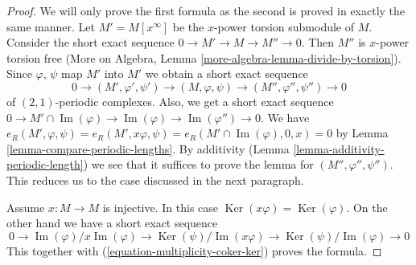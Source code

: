 \documentclass[10pt,a4paper]{amsart}
\theoremstyle{plain}
\theoremstyle{definition}
\theoremstyle{remark}
\numberwithin{equation}{subsection}
\def\Ker{\mathop{\mathrm{Ker}}}
\def\Im{\mathop{\mathrm{Im}}}
\begin{document}
\begin{proof}
We will only prove the first formula as the second is proved
in exactly the same manner.
Let $M' = M[x^\infty]$ be the $x$-power torsion submodule of $M$.
Consider the short exact sequence $0 \to M' \to M \to M'' \to 0$.
Then $M''$ is $x$-power torsion free (More on Algebra, Lemma
\ref{more-algebra-lemma-divide-by-torsion}).
Since $\varphi$, $\psi$ map $M'$ into $M'$
we obtain a short exact sequence
$$
0 \to (M', \varphi', \psi') \to (M, \varphi, \psi) \to
(M'', \varphi'', \psi'') \to 0
$$
of $(2, 1)$-periodic complexes. Also, we get a short exact sequence
$0 \to M' \cap \Im(\varphi) \to \Im(\varphi) \to \Im(\varphi'') \to 0$.
We have
$e_R(M', \varphi, \psi) = e_R(M', x\varphi, \psi) =
e_R(M' \cap \Im(\varphi), 0, x) = 0$
by Lemma \ref{lemma-compare-periodic-lengths}.
By additivity (Lemma \ref{lemma-additivity-periodic-length})
we see that it suffices to prove the lemma for $(M'', \varphi'', \psi'')$.
This reduces us to the case discussed in the next paragraph.

\medskip\noindent
Assume $x : M \to M$ is injective.
In this case $\Ker(x\varphi) = \Ker(\varphi)$.
On the other hand we have a short exact sequence
$$
0 \to \Im(\varphi)/x\Im(\varphi) \to
\Ker(\psi)/\Im(x\varphi) \to \Ker(\psi)/\Im(\varphi) \to 0
$$
This together with (\ref{equation-multiplicity-coker-ker}) proves the formula.
\end{proof}
\end{document}
